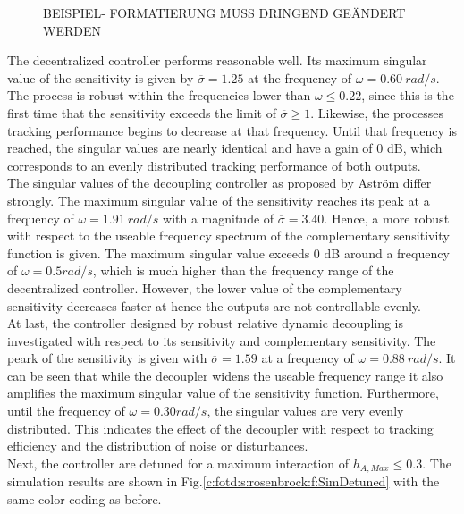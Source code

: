 \begin{figure}[H]\centering

\caption{BEISPIEL- FORMATIERUNG MUSS DRINGEND GEÄNDERT WERDEN}
\label{c:fotd:s:rosenbrock:f:SingVal}
\end{figure}

The decentralized controller performs reasonable well. Its maximum singular value of the sensitivity is given by $\overline{\sigma} = 1.25$ at the frequency of $\omega = 0.60 ~rad/s$. The process is robust within the frequencies lower than $\omega \leq 0.22$, since this is the first time that the sensitivity exceeds the limit of $\overline{\sigma} \geq 1$. Likewise, the processes tracking performance begins to decrease at that frequency. Until that frequency is reached, the singular values are nearly identical and have a gain of 0 dB, which corresponds to an evenly distributed tracking performance of both outputs. \\

The singular values of the decoupling controller as proposed by Astr\"om differ strongly. The maximum singular value of the sensitivity reaches its peak at a frequency of $\omega = 1.91 ~rad/s$ with a magnitude of $\overline{\sigma} = 3.40$. Hence, a more robust with respect to the useable frequency spectrum of the complementary sensitivity function is given. The maximum singular value exceeds 0 dB around a frequency of $\omega = 0.5 rad/s$, which is much higher than the frequency range of the decentralized controller. However, the lower value of the complementary sensitivity decreases faster at hence the outputs are not controllable evenly.\\

At last, the controller designed by robust relative dynamic decoupling is investigated with respect to its sensitivity and complementary sensitivity. The peark of the sensitivity is given with $\overline{\sigma} = 1.59$ at a frequency of $\omega = 0.88 ~rad/s$. It can be seen that while the decoupler widens the useable frequency range it also amplifies the maximum singular value of the sensitivity function. Furthermore, until the frequency of $\omega = 0.30 rad/s$, the singular values are very evenly distributed. This indicates the effect of the decoupler with respect to tracking efficiency and the distribution of noise or disturbances.\\

Next, the controller are detuned for a maximum interaction of $h_{A,Max} \leq 0.3$. The simulation results are shown in Fig.\ref{c:fotd:s:rosenbrock:f:SimDetuned} with the same color coding as before. \\

